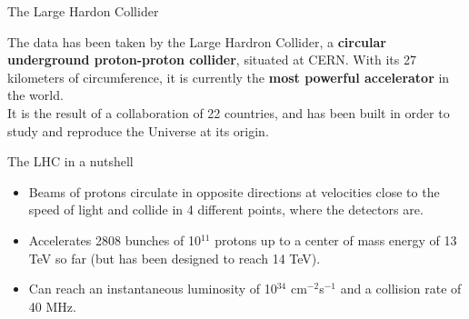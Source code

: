 \documentclass[8 pt]{beamer}
\begin{document}
\begin{frame}{The Large Hardon Collider}

	\begin{minipage}[c]{.49\linewidth}
   	\end{minipage} \hfill
   	\begin{minipage}[c]{.49\linewidth}
	\justifying
	The data has been taken by the Large Hardron Collider, a \textbf{circular underground proton-proton collider}, situated at CERN. With its 27 kilometers of circumference, it is currently the \textbf{most powerful accelerator} in the world. \\ \vspace{10pt}
	It is the result of a collaboration of 22 countries, and has been built in order to study and reproduce the Universe at its origin. \vfill
   	\end{minipage} \hfill \vfill	

	\begin{block}{\vspace{5pt} The LHC in a nutshell}
	\begin{itemize}
	\justifying
	\vspace{5pt}
	\item Beams of protons circulate in opposite directions at velocities close to the speed of light and collide in 4 different points, where the detectors are. \\ \vspace{3pt}
	\item Accelerates 2808 bunches of 10$^{11}$ protons up to a center of mass energy of 13 TeV so far (but has been designed to reach 14 TeV). \\ \vspace{3pt}
	\item Can reach an instantaneous luminosity of 10$^{34}$ cm$^{-2}$s$^{-1}$ and a collision rate of 40 MHz.\\ \vspace{5pt}
	\end{itemize}
	\end{block} \vfill
	
\end{frame}
\end{document}
